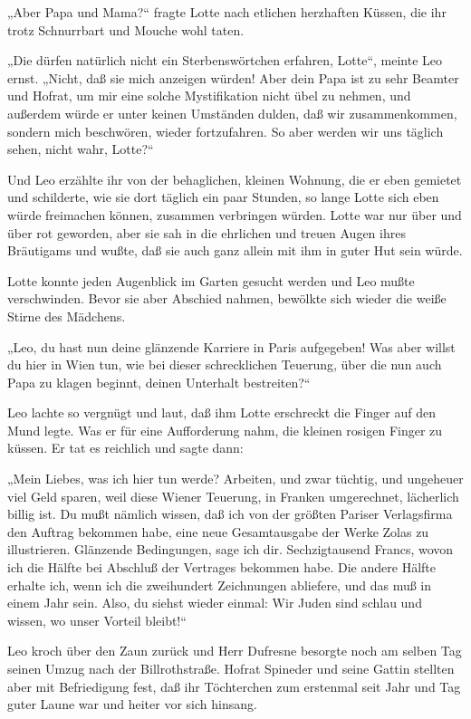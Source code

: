 „Aber Papa und Mama?“ fragte Lotte nach etlichen herzhaften Küssen,
die ihr trotz Schnurrbart und Mouche wohl taten.

„Die dürfen natürlich nicht ein Sterbenswörtchen
erfahren, Lotte“, meinte Leo ernst. „Nicht, daß sie mich anzeigen
würden! Aber dein Papa ist zu sehr Beamter und Hofrat, um mir eine
solche Mystifikation nicht übel zu nehmen, und außerdem würde er
unter keinen Umständen dulden, daß wir zusammenkommen, sondern mich
beschwören, wieder fortzufahren. So aber werden wir uns täglich
sehen, nicht wahr, Lotte?“

Und Leo erzählte ihr von der behaglichen, kleinen Wohnung, die er
eben gemietet und schilderte, wie sie dort täglich ein paar
Stunden, so lange Lotte sich eben würde freimachen können, zusammen
verbringen würden. Lotte war nur über und über rot geworden, aber
sie sah in die ehrlichen und treuen Augen ihres Bräutigams und
wußte, daß sie auch ganz allein mit ihm in guter Hut sein würde.

Lotte konnte jeden Augenblick im Garten gesucht werden und Leo
mußte verschwinden. Bevor sie aber Abschied nahmen, bewölkte sich
wieder die weiße Stirne des Mädchens.

„Leo, du hast nun deine glänzende Karriere in Paris aufgegeben! Was
aber willst du hier in Wien tun, wie bei dieser schrecklichen
Teuerung, über die nun auch Papa zu klagen beginnt, deinen
Unterhalt bestreiten?“

Leo lachte so vergnügt und laut, daß ihm Lotte erschreckt die
Finger auf den Mund legte. Was er für eine Aufforderung nahm, die
kleinen rosigen Finger zu küssen. Er tat es reichlich und sagte
dann:

„Mein Liebes, was ich hier tun werde? Arbeiten, und zwar tüchtig,
und ungeheuer viel Geld sparen, weil diese  Wiener
Teuerung, in Franken umgerechnet, lächerlich billig ist. Du mußt
nämlich wissen, daß ich von der größten Pariser Verlagsfirma den
Auftrag bekommen habe, eine neue Gesamtausgabe der Werke Zolas zu
illustrieren. Glänzende Bedingungen, sage ich dir. Sechzigtausend
Francs, wovon ich die Hälfte bei Abschluß der Vertrages bekommen
habe. Die andere Hälfte erhalte ich, wenn ich die zweihundert
Zeichnungen abliefere, und das muß in einem Jahr sein. Also, du
siehst wieder einmal: Wir Juden sind schlau und wissen, wo unser
Vorteil bleibt!“

Leo kroch über den Zaun zurück und Herr Dufresne besorgte noch am
selben Tag seinen Umzug nach der Billrothstraße. Hofrat Spineder
und seine Gattin stellten aber mit Befriedigung fest, daß ihr
Töchterchen zum erstenmal seit Jahr und Tag guter Laune war und
heiter vor sich hinsang.

